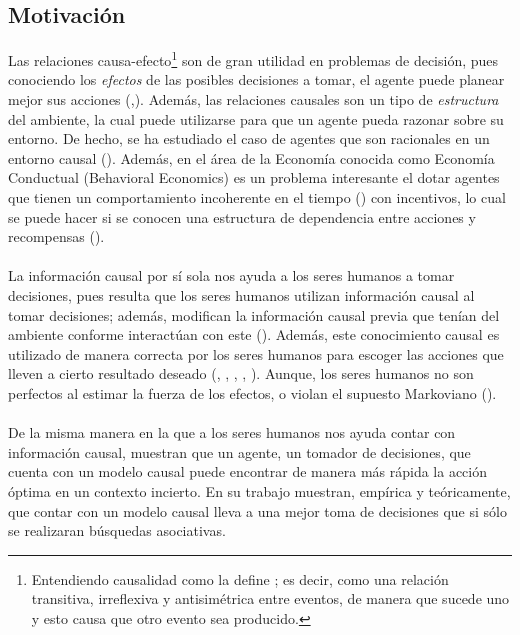 \documentclass[11pt]{article}
\theoremstyle{plain}
\begin{document}
	\subsection{Motivación}
	Las relaciones causa-efecto\footnote{Entendiendo causalidad como la define \cite{spirtes2000causation}; es decir, como una relación transitiva, irreflexiva y antisimétrica entre eventos, de manera que sucede uno y esto causa que otro evento sea producido.} son de gran utilidad en problemas de decisión, pues conociendo los \textit{efectos} de las posibles decisiones a tomar, el agente puede planear mejor sus acciones (\cite{hagmayer2013repeated},\cite{pearlwhy}). Además, las relaciones causales son un tipo de \textit{estructura} del ambiente, la cual puede utilizarse para que un agente pueda razonar sobre su entorno. De hecho, se ha estudiado el caso de agentes que son racionales en un entorno causal (\cite{board2006equivalence}). Además, en el área de la Economía conocida como Economía Conductual (Behavioral Economics) es un problema interesante el dotar agentes que tienen un comportamiento incoherente en el tiempo (\cite{kleinberg2014time}) con incentivos, lo cual se puede hacer si se conocen una estructura de dependencia entre acciones y recompensas (\cite{albers2016motivating}). \\
\\
\indent La información causal por sí sola nos ayuda a los seres humanos a tomar decisiones, pues resulta que los seres humanos utilizan información causal al tomar decisiones; además, modifican la información causal previa que tenían del ambiente conforme interactúan con este (\cite{hagmayer2013repeated}). Además, este conocimiento causal es utilizado de manera correcta por los seres humanos para escoger las acciones que lleven a cierto resultado deseado (\cite{sloman2006causal}, \cite{nichols2007decision}, \cite{meder2010observing}, \cite{hagmayer2013repeated}, \cite{danks2014unifying}). Aunque, los seres humanos no son perfectos al estimar la fuerza de los efectos, o violan el supuesto Markoviano (\cite{rottman2014reasoning}). \\
\\
\indent De la misma manera en la que a los seres humanos nos ayuda contar con información causal, \cite{lattimoreNIPS2016} muestran que un agente, un tomador de decisiones, que cuenta con un modelo causal puede encontrar de manera más rápida la acción óptima en un contexto incierto. En su trabajo muestran, empírica y teóricamente, que contar con un modelo causal lleva a una mejor toma de decisiones que si sólo se realizaran búsquedas asociativas.\\
\end{document}
